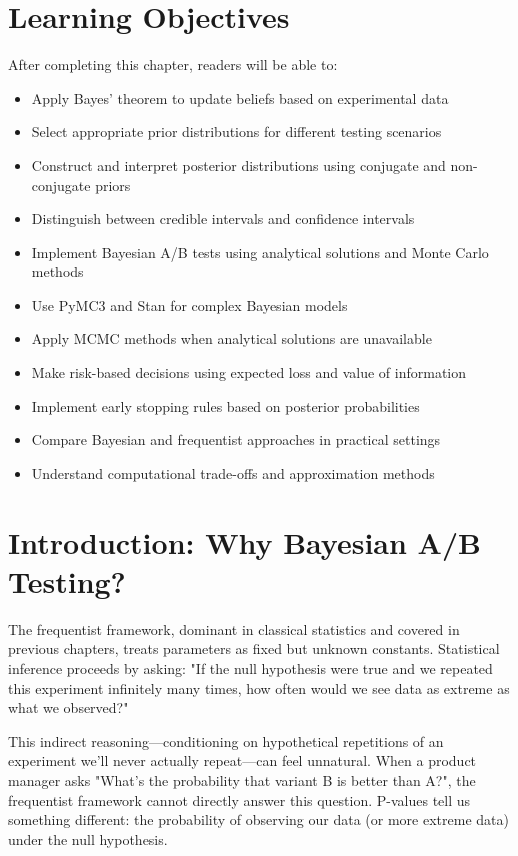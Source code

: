 
\section{Learning Objectives}

After completing this chapter, readers will be able to:
\begin{itemize}
    \item Apply Bayes' theorem to update beliefs based on experimental data
    \item Select appropriate prior distributions for different testing scenarios
    \item Construct and interpret posterior distributions using conjugate and non-conjugate priors
    \item Distinguish between credible intervals and confidence intervals
    \item Implement Bayesian A/B tests using analytical solutions and Monte Carlo methods
    \item Use PyMC3 and Stan for complex Bayesian models
    \item Apply MCMC methods when analytical solutions are unavailable
    \item Make risk-based decisions using expected loss and value of information
    \item Implement early stopping rules based on posterior probabilities
    \item Compare Bayesian and frequentist approaches in practical settings
    \item Understand computational trade-offs and approximation methods
\end{itemize}

\section{Introduction: Why Bayesian A/B Testing?}

The frequentist framework, dominant in classical statistics and covered in previous chapters, treats parameters as fixed but unknown constants. Statistical inference proceeds by asking: "If the null hypothesis were true and we repeated this experiment infinitely many times, how often would we see data as extreme as what we observed?"

This indirect reasoning—conditioning on hypothetical repetitions of an experiment we'll never actually repeat—can feel unnatural. When a product manager asks "What's the probability that variant B is better than A?", the frequentist framework cannot directly answer this question. P-values tell us something different: the probability of observing our data (or more extreme data) under the null hypothesis.

